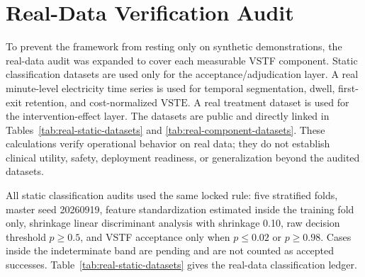 \documentclass[11pt,a4paper]{article}
\newcommand{\VSTE}{\ensuremath{\mathrm{VSTE}}}
\newcommand{\1}{\mathbf{1}}
\begin{document}
\section{Real-Data Verification Audit}

To prevent the framework from resting only on synthetic demonstrations, the real-data audit was expanded to cover each measurable VSTF component. Static classification datasets are used only for the acceptance/adjudication layer. A real minute-level electricity time series is used for temporal segmentation, dwell, first-exit retention, and cost-normalized \VSTE{}. A real treatment dataset is used for the intervention-effect layer. The datasets are public and directly linked in Tables~\ref{tab:real-static-datasets} and \ref{tab:real-component-datasets}. These calculations verify operational behavior on real data; they do not establish clinical utility, safety, deployment readiness, or generalization beyond the audited datasets.

All static classification audits used the same locked rule: five stratified folds, master seed 20260919, feature standardization estimated inside the training fold only, shrinkage linear discriminant analysis with shrinkage 0.10, raw decision threshold $p\geq0.5$, and VSTF acceptance only when $p\leq0.02$ or $p\geq0.98$. Cases inside the indeterminate band are pending and are not counted as accepted successes. Table~\ref{tab:real-static-datasets} gives the real-data classification ledger.
\end{document}
